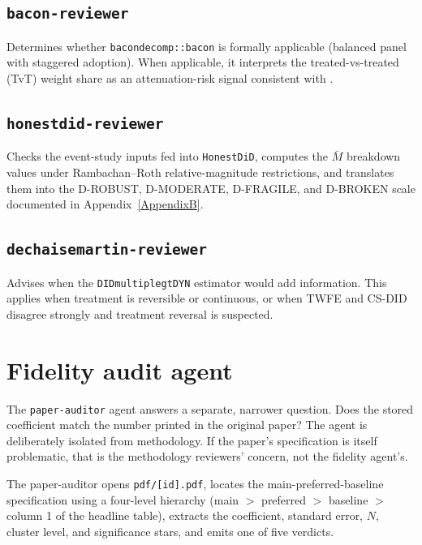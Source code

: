 \subsection*{\texttt{bacon-reviewer}}

Determines whether \texttt{bacondecomp::bacon} is formally applicable (balanced panel with staggered adoption). When applicable, it interprets the treated-vs-treated (TvT) weight share as an attenuation-risk signal consistent with \textcite{goodman2021difference}.

\subsection*{\texttt{honestdid-reviewer}}

Checks the event-study inputs fed into \texttt{HonestDiD}, computes the $\bar M$ breakdown values under Rambachan--Roth relative-magnitude restrictions, and translates them into the D-ROBUST, D-MODERATE, D-FRAGILE, and D-BROKEN scale documented in Appendix~\ref{AppendixB}.

\subsection*{\texttt{dechaisemartin-reviewer}}

Advises when the \texttt{DIDmultiplegtDYN} estimator would add information. This applies when treatment is reversible or continuous, or when TWFE and CS-DID disagree strongly and treatment reversal is suspected.


\section{Fidelity audit agent}
\label{sec:appc_fidelity}

The \texttt{paper-auditor} agent answers a separate, narrower question. Does the stored coefficient match the number printed in the original paper? The agent is deliberately isolated from methodology. If the paper's specification is itself problematic, that is the methodology reviewers' concern, not the fidelity agent's.

The paper-auditor opens \texttt{pdf/[id].pdf}, locates the main-preferred-baseline specification using a four-level hierarchy (main $>$ preferred $>$ baseline $>$ column 1 of the headline table), extracts the coefficient, standard error, $N$, cluster level, and significance stars, and emits one of five verdicts.

